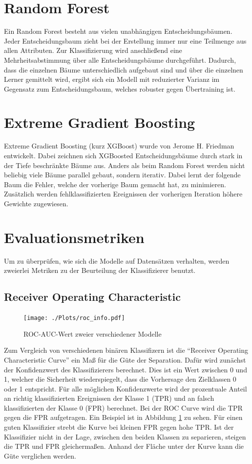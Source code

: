 \section{Random Forest}
Ein Random Forest besteht aus vielen unabhängigen Entscheidungsbäumen.
Jeder Entscheidungsbaum zieht bei der Erstellung immer nur eine Teilmenge aus allen Attributen.
Zur Klassifizierung wird anschließend eine Mehrheitsabstimmung über alle Entscheidungsbäume durchgeführt.
Dadurch, dass die einzelnen Bäume unterschiedlich aufgebaut sind und über die einzelnen Lerner gemittelt wird, ergibt sich ein Modell mit reduzierter Varianz im Gegensatz zum Entscheidungsbaum, welches robuster gegen Übertraining ist.
\section{Extreme Gradient Boosting}
Extreme Gradient Boosting (kurz XGBoost) wurde von Jerome H. Friedman~\cite{xgboost} entwickelt.
Dabei zeichnen sich  XGBoosted Entscheidungsbäume durch stark in der Tiefe beschränkte Bäume aus.
Anders als beim Random Forest werden nicht beliebig viele Bäume parallel gebaut, sondern iterativ. 
Dabei lernt der folgende Baum die Fehler, welche der vorherige Baum gemacht hat, zu minimieren.
Zusätzlich werden fehlklassifizierten Ereignissen der vorherigen Iteration höhere Gewichte zugewiesen.

\section{Evaluationsmetriken}
Um zu überprüfen, wie sich die Modelle auf Datensätzen verhalten, werden zweierlei Metriken zu der Beurteilung der Klassifizierer benutzt.
\subsection*{Receiver Operating Characteristic}
\begin{figure}
  \centering
  \texttt{[image: ./Plots/roc\_info.pdf]}
  \caption{ROC-AUC-Wert zweier verschiedener Modelle}
  \label{fig:roc}
\end{figure}
Zum Vergleich von verschiedenen binären Klassifizern ist die \enquote{Receiver Operating Characteristic Curve} ein Maß für die Güte der Separation. 
Dafür wird zunächst der Konfidenzwert des Klassifizierers berechnet. 
Dies ist ein Wert zwischen 0 und 1, welcher die Sicherheit wiederspiegelt, dass die Vorhersage den Zielklassen 0 oder 1 entspricht.
Für alle möglichen Konfidenzwerte wird der prozentuale Anteil an richtig klassifizierten Ereignissen der Klasse 1 (TPR) und an falsch klassifizierten der Klasse 0 (FPR) berechnet. 
Bei der ROC Curve wird die TPR gegen die FPR aufgetragen. 
Ein Beispiel ist in Abbildung \ref{fig:roc} zu sehen.
Für einen guten Klassifizier strebt die Kurve bei kleinen FPR gegen hohe TPR. 
Ist der Klassifizier nicht in der Lage, zwischen den beiden Klassen zu separieren, steigen die TPR und FPR gleichermaßen. 
Anhand der Fläche unter der Kurve kann die Güte verglichen werden.
